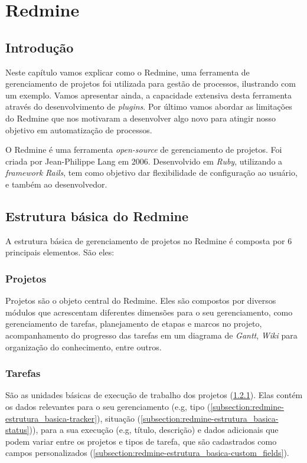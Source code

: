 \chapter{Redmine}\label{chp:redmine}

\section{Introdução}\label{sec:redmine-introducao}
Neste capítulo vamos explicar como o Redmine, uma ferramenta de gerenciamento de projetos foi utilizada para gestão de processos, ilustrando com um exemplo. Vamos apresentar ainda, a capacidade extensiva desta ferramenta através do desenvolvimento de \textit{plugins}. Por último vamos abordar as limitações do Redmine que nos motivaram a desenvolver algo novo para atingir nosso objetivo em automatização de processos.

O Redmine\cite{redmine} é uma ferramenta \textit{open-source} de gerenciamento de projetos. Foi criada por Jean-Philippe Lang em 2006. Desenvolvido em \textit{Ruby}, utilizando a \textit{framework} \textit{Rails}, tem como objetivo dar flexibilidade de configuração ao usuário, e também ao desenvolvedor.


\section{Estrutura básica do Redmine}\label{sec:redmine-estrutura_basica}

A estrutura básica de gerenciamento de projetos no Redmine é composta por 6 principais elementos. São eles:

\subsection{Projetos}\label{subsection:redmine-estrutura_basica-projeto}

Projetos são o objeto central do Redmine. Eles são compostos por diversos módulos que acrescentam diferentes dimensões para o seu gerenciamento, como gerenciamento de tarefas, planejamento de etapas e marcos no projeto, acompanhamento do progresso das tarefas em um diagrama de \textit{Gantt}, \textit{Wiki} para organização do conhecimento, entre outros. 
\subsection{Tarefas}\label{subsection:redmine-estrutura_basica-tarefa}

São as unidades básicas de execução de trabalho dos projetos (\ref{subsection:redmine-estrutura_basica-projeto}). Elas contém os dados relevantes para o seu gerenciamento (e.g, tipo (\ref{subsection:redmine-estrutura_basica-tracker}), situação (\ref{subsection:redmine-estrutura_basica-status})), para a sua execução (e.g, título, descrição) e dados adicionais que podem variar entre os projetos e tipos de tarefa, que são cadastrados como campos personalizados (\ref{subsection:redmine-estrutura_basica-custom_fields}).  


